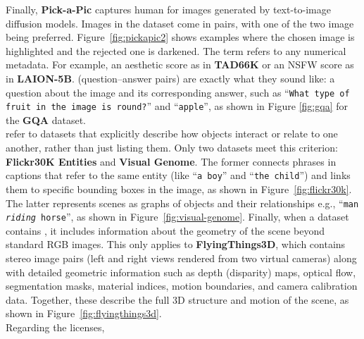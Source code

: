 ﻿\documentclass[11pt,a4paper]{article}
\begin{document}
Finally, \textbf{Pick-a-Pic} captures human  for images generated by text-to-image diffusion models. Images in the dataset come in pairs, with one of the two image being preferred. Figure~\ref{fig:pickapic2} shows examples where the chosen image is highlighted and the rejected one is darkened. The term  refers to any numerical metadata. For example, an aesthetic score as in \textbf{TAD66K} or an NSFW score as in \textbf{LAION-5B}.  (question–answer pairs) are exactly what they sound like: a question about the image and its corresponding answer, such as “\texttt{What type of fruit in the image is round?}” and “\texttt{apple}”, as shown in Figure \ref{fig:gqa} for the \textbf{GQA} dataset.\\


  refer to datasets that explicitly describe how objects interact or relate to one another, rather than just listing them. Only two datasets meet this criterion: \textbf{Flickr30K Entities} and \textbf{Visual Genome}. The former connects phrases in captions that refer to the same entity (like “\texttt{a boy}” and “\texttt{the child}”) and links them to specific bounding boxes in the image, as shown in Figure~\ref{fig:flickr30k}. The latter represents scenes as graphs of objects and their relationships e.g., “\texttt{man \textit{riding} horse}”, as shown in Figure~\ref{fig:visual-genome}. Finally, when a dataset contains , it includes information about the geometry of the scene beyond standard RGB images. This only applies to \textbf{FlyingThings3D}, which contains stereo image pairs (left and right views rendered from two virtual cameras) along with detailed geometric information such as depth (disparity) maps, optical flow, segmentation masks, material indices, motion boundaries, and camera calibration data. Together, these describe the full 3D structure and motion of the scene, as shown in Figure~\ref{fig:flyingthings3d}.\\

Regarding the licenses,

\clearpage
\end{document}
